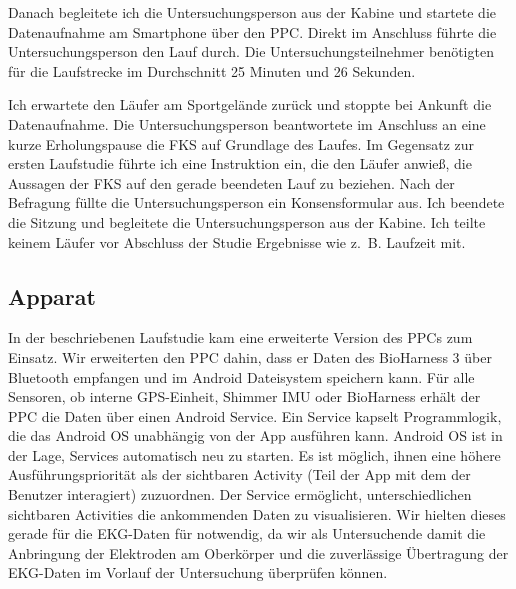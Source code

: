 Danach begleitete ich die Untersuchungsperson aus der Kabine und startete die Datenaufnahme am Smartphone über den \ac{PPC}. Direkt im Anschluss führte die Untersuchungsperson den Lauf durch. Die Untersuchungsteilnehmer benötigten für die Laufstrecke im Durchschnitt 25 Minuten und 26 Sekunden. 

Ich erwartete den Läufer am Sportgelände zurück und stoppte bei Ankunft die Datenaufnahme. Die Untersuchungsperson beantwortete im Anschluss an eine kurze Erholungspause die \ac{FKS} auf Grundlage des Laufes. Im Gegensatz zur ersten Laufstudie führte ich eine Instruktion ein, die den Läufer anwieß, die Aussagen der \ac{FKS} auf den gerade beendeten Lauf zu beziehen. Nach der Befragung füllte die Untersuchungsperson ein Konsensformular aus. Ich beendete die Sitzung und begleitete die Untersuchungsperson aus der Kabine. Ich teilte keinem Läufer vor Abschluss der Studie Ergebnisse wie z.~B. Laufzeit mit. 

\subsection{Apparat} 

\label{sub:apparat}

In der beschriebenen Laufstudie kam eine erweiterte Version des \ac{PPC}s zum Einsatz. Wir erweiterten den \ac{PPC} dahin, dass er Daten des BioHarness 3 über Bluetooth empfangen und im Android Dateisystem speichern kann. Für alle Sensoren, ob interne \ac{GPS}-Einheit, Shimmer \ac{IMU} oder BioHarness erhält der \ac{PPC} die Daten über einen Android Service. Ein Service kapselt Programmlogik, die das Android OS unabhängig von der App ausführen kann. Android OS ist in der Lage, Services automatisch neu zu starten. Es ist möglich, ihnen eine höhere Ausführungspriorität als der sichtbaren Activity (Teil der App mit dem der Benutzer interagiert) zuzuordnen. Der Service ermöglicht, unterschiedlichen sichtbaren Activities die ankommenden Daten zu visualisieren. Wir hielten dieses gerade für die \ac{EKG}-Daten für notwendig, da wir als Untersuchende damit die Anbringung der Elektroden am Oberkörper und die zuverlässige Übertragung der \ac{EKG}-Daten im Vorlauf der Untersuchung überprüfen können. 

